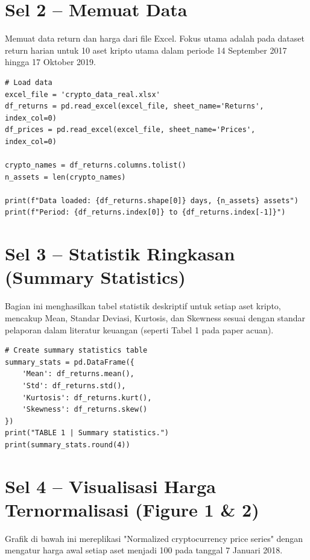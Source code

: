 \documentclass[12pt,a4paper]{article}
\begin{document}
\section{Sel 2 -- Memuat Data}
Memuat data return dan harga dari file Excel. Fokus utama adalah pada dataset return harian untuk 10 aset kripto utama dalam periode 14 September 2017 hingga 17 Oktober 2019.

\begin{lstlisting}[caption={Load dataset kripto}]
# Load data
excel_file = 'crypto_data_real.xlsx'
df_returns = pd.read_excel(excel_file, sheet_name='Returns', index_col=0)
df_prices = pd.read_excel(excel_file, sheet_name='Prices', index_col=0)

crypto_names = df_returns.columns.tolist()
n_assets = len(crypto_names)

print(f"Data loaded: {df_returns.shape[0]} days, {n_assets} assets")
print(f"Period: {df_returns.index[0]} to {df_returns.index[-1]}")
\end{lstlisting}

\section{Sel 3 -- Statistik Ringkasan (Summary Statistics)}
Bagian ini menghasilkan tabel statistik deskriptif untuk setiap aset kripto, mencakup Mean, Standar Deviasi, Kurtosis, dan Skewness sesuai dengan standar pelaporan dalam literatur keuangan (seperti Tabel 1 pada paper acuan).

\begin{lstlisting}[caption={Kalkulasi statistik deskriptif aset}]
# Create summary statistics table
summary_stats = pd.DataFrame({
    'Mean': df_returns.mean(),
    'Std': df_returns.std(),
    'Kurtosis': df_returns.kurt(),
    'Skewness': df_returns.skew()
})
print("TABLE 1 | Summary statistics.")
print(summary_stats.round(4))
\end{lstlisting}

\section{Sel 4 -- Visualisasi Harga Ternormalisasi (Figure 1 \& 2)}
Grafik di bawah ini mereplikasi "Normalized cryptocurrency price series" dengan mengatur harga awal setiap aset menjadi 100 pada tanggal 7 Januari 2018.
\end{document}
